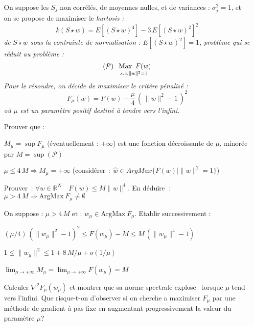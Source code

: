 \documentclass[12pt,a4paper,fleqn]{report}
\newcommand{\R}{\mathbb R}
\newcommand{\hess}{\nabla^2}
\newcommand{\on}{\begin{displaymath}}
\newcommand{\off}{\end{displaymath}}
\renewcommand{\P}{\mathcal P}
\newcommand{\push}[1]{\rule{0pt}{0pt}\hspace{#1pt}}
\begin{document}
\begin{exercice}
On suppose les $S_j$ non corrélés, de moyennes nulles, et de variances :  $\sigma_j^2=1$, et on se propose de maximiser le \it kurtosis \rm :  
\on  k(S\star w)= E[(S\star w)^4] -3\,E[(S\star w)^2] ^2 \off
de $S\star w$  sous la contrainte de normalisation : \mbox{$E[(S\star w)^2]=1$}, problème qui se réduit  au problème :
\on ( \P)  \push{5} \underset{ s. c. \|w\|^2=1}{\push 3\mbox{Max}\push 5 F(w)}  \off
 Pour le résoudre, on décide de maximiser le critère  pénalisé :  
 \on F_{\mu}(w)=F(w)-\frac{\mu}{4}\,\left(\,\|w\|^2-1\,\right)^2 \off
 où $\mu$ est un paramètre positif destiné à tendre vers l'infini. 
  \begin{questions}
\item Prouver que : 
\begin{subquestions}
\item$M_{\mu}= \sup F_{\mu}$ (éventuellement : $+\infty$) est une fonction décroissante de $\mu$, minorée par $M=\sup (\P)$
\item $\mu\leq 4\,M \Rightarrow M_{\mu}=+\infty$ (considérer~: $\hat w\in ArgMax \{F(w)   |   \|w\|^2=1   \}$)
\item Prouver~: $\forall w\in\R^N \quad F(w)\leq M \|w\|^4$. En déduire~: $\mu> 4\,M \Rightarrow \mathrm{ArgMax}\ F_{\mu} \neq \emptyset$ 
\end{subquestions}
\item On suppose : $\mu> 4\,M$ et : $w_{\mu}\in\mathrm{ArgMax}\ F_{\mu}$. Etablir successivement :
\begin{subquestions}
\item $ (\mu/4)\,(\|w_{\mu}\|^2-1)^2 \leq F(w_{\mu})-M\leq M\,(\|w_{\mu}\|^4-1)$
\item $1\leq \|w_{\mu}\|^2\leq 1+8\,M/\mu +o(1/\mu)$
\item $\lim_{\mu\rightarrow +\infty} M_{\mu}=\lim_{\mu\rightarrow +\infty} F(w_{\mu})= M$
\end{subquestions}
\item Calculer $\hess F_{\mu}(w_{\mu})$ et montrer que sa norme spectrale  \og explose \fg\  lorsque $\mu$ tend vers l'infini.
Que risque-t-on d'observer si on cherche a maximiser $F_{\mu}$ par une méthode de gradient à pas fixe en augmentant progressivement la valeur du paramètre $\mu$?
\end{questions}
\end{exercice}
\end{document}
